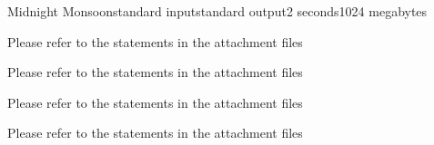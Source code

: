 \begin{problem}{Midnight Monsoon}{standard input}{standard output}{2 seconds}{1024 megabytes}

Please refer to the statements in the attachment files

\InputFile
Please refer to the statements in the attachment files

\OutputFile
Please refer to the statements in the attachment files

\Example

\begin{example}
%
\end{example}

\Note
Please refer to the statements in the attachment files

\end{problem}

